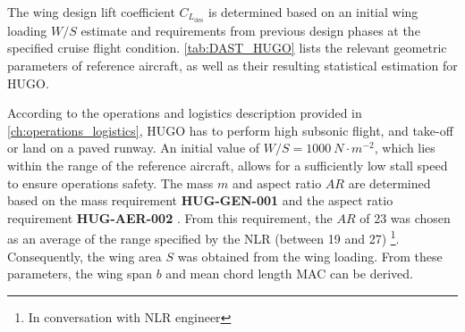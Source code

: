 
The wing design lift coefficient $C_{L_\text{des}}$ is determined based on an initial wing loading $W/S$ estimate and requirements from previous design phases  at the specified cruise flight condition. \autoref{tab:DAST_HUGO} lists the relevant geometric parameters of reference aircraft, as well as their resulting statistical estimation for HUGO.


According to the operations and logistics description provided in \autoref{ch:operations_logistics}, HUGO has to perform high subsonic flight, and take-off or land on a paved runway. An initial value of $W/S = 1000\  N \cdot m^{-2}$, which lies within the range of the reference aircraft, allows for a sufficiently low stall speed to ensure operations safety.
The mass $m$ and aspect ratio $AR$ are determined based on the mass requirement \textbf{HUG-GEN-001} and the aspect ratio requirement \textbf{HUG-AER-002} . From this requirement, the $AR$ of 23 was chosen as an average of the range specified by the NLR (between 19 and 27) \footnote{In conversation with NLR engineer }.
Consequently, the wing area $S$ was obtained from the wing loading. From these parameters, the wing span $b$ and mean chord length MAC can be derived. 

